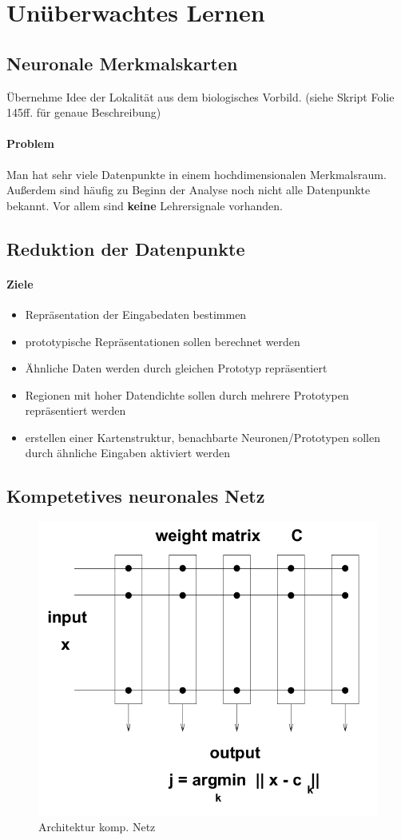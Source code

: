 \section{Unüberwachtes Lernen}

\subsection{Neuronale Merkmalskarten}
Übernehme Idee der Lokalität aus dem biologisches Vorbild. (siehe Skript Folie 145ff. für genaue Beschreibung)

\paragraph{Problem}
Man hat sehr viele Datenpunkte in einem hochdimensionalen Merkmalsraum. Außerdem sind häufig zu Beginn der Analyse noch nicht alle Datenpunkte bekannt. Vor allem sind \textbf{keine} Lehrersignale vorhanden.

\subsection{Reduktion der Datenpunkte}
\paragraph{Ziele}
\begin{itemize}
    \item Repräsentation der Eingabedaten bestimmen
    \item prototypische Repräsentationen sollen berechnet werden 
    \item Ähnliche Daten werden durch gleichen Prototyp repräsentiert
    \item Regionen mit hoher Datendichte sollen durch mehrere Prototypen repräsentiert werden
    \item erstellen einer Kartenstruktur, benachbarte Neuronen/Prototypen sollen durch ähnliche Eingaben aktiviert werden
\end{itemize}

\subsection{Kompetetives neuronales Netz}

\begin{figure}[h]
    \centering
    \includegraphics[width=.33\textwidth]{img/NeuroLernregel/kompNetz.png}
    \caption{Architektur komp. Netz}
    \label{ch_lern_upstart}
\end{figure}

